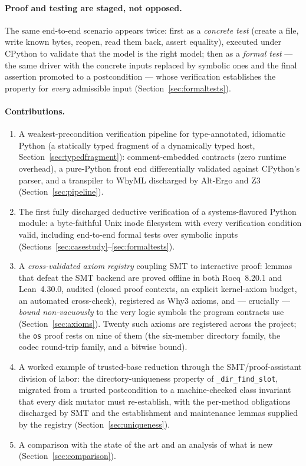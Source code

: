 \documentclass[11pt]{article}
\newcommand{\whyml}{\textsf{WhyML}}
\newcommand{\why}{\textsf{Why3}}
\newcommand{\altergo}{\textsf{Alt-Ergo}}
\newcommand{\zthree}{\textsf{Z3}}
\newcommand{\rocq}{\textsf{Rocq}}
\newcommand{\lean}{\textsf{Lean}}
\newcommand{\osmod}{\texttt{os}}
\begin{document}
\paragraph{Proof and testing are staged, not opposed.}
The same end-to-end scenario appears twice: first as a \emph{concrete test}
(create a file, write known bytes, reopen, read them back, assert equality),
executed under CPython to validate that the model is the right model; then as
a \emph{formal test} --- the same driver with the concrete inputs replaced by
symbolic ones and the final assertion promoted to a postcondition --- whose
verification establishes the property for \emph{every} admissible input
(Section~\ref{sec:formaltests}).

\paragraph{Contributions.}
\begin{enumerate}
\item A weakest-precondition verification pipeline for type-annotated,
  idiomatic Python (a statically typed fragment of a dynamically typed
  host, Section~\ref{sec:typedfragment}):
  comment-embedded contracts (zero runtime overhead), a pure-Python front end
  differentially validated against CPython's parser, and a transpiler to
  \whyml{} discharged by \altergo{} and \zthree{}
  (Section~\ref{sec:pipeline}).
\item The first fully discharged deductive verification of a systems-flavored
  Python module: a byte-faithful Unix inode filesystem with every
  verification condition valid, including end-to-end formal tests over
  symbolic inputs (Sections~\ref{sec:casestudy}--\ref{sec:formaltests}).
\item A \emph{cross-validated axiom registry} coupling SMT to interactive
  proof: lemmas that defeat the SMT backend are proved offline in both
  \rocq{}~8.20.1 and \lean{}~4.30.0, audited (closed proof contexts, an
  explicit kernel-axiom budget, an automated cross-check), registered as
  \why{} axioms, and --- crucially --- \emph{bound non-vacuously} to the very
  logic symbols the program contracts use (Section~\ref{sec:axioms}). Twenty
  such axioms are registered across the project; the \osmod{} proof rests on
  nine of them (the six-member directory family, the codec round-trip family,
  and a bitwise bound).
\item A worked example of trusted-base reduction through the SMT/proof-assistant
  division of labor: the directory-uniqueness property of
  \texttt{\_dir\_find\_slot}, migrated from a trusted postcondition to a
  machine-checked class invariant that every disk mutator must re-establish,
  with the per-method obligations discharged by SMT and the establishment and
  maintenance lemmas supplied by the registry (Section~\ref{sec:uniqueness}).
\item A comparison with the state of the art and an analysis of what is new
  (Section~\ref{sec:comparison}).
\end{enumerate}
\end{document}
